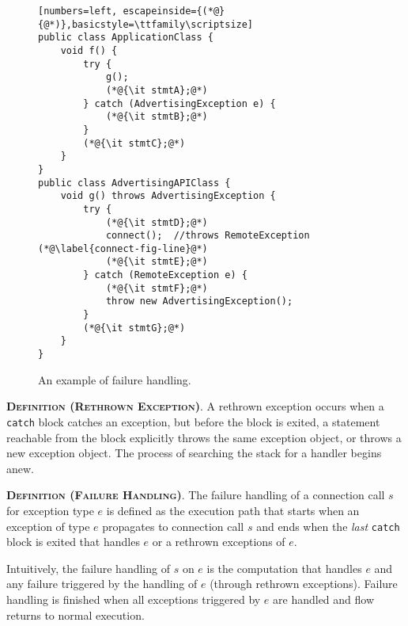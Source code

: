 \begin{figure}
\begin{lstlisting}[numbers=left, escapeinside={(*@}{@*)},basicstyle=\ttfamily\scriptsize]
public class ApplicationClass {
    void f() {
        try {
            g();
            (*@{\it stmtA};@*)
        } catch (AdvertisingException e) {
            (*@{\it stmtB};@*)
        }
        (*@{\it stmtC};@*)
    }
}
public class AdvertisingAPIClass {
    void g() throws AdvertisingException {
        try {
            (*@{\it stmtD};@*)
            connect();  //throws RemoteException (*@\label{connect-fig-line}@*)
            (*@{\it stmtE};@*)
        } catch (RemoteException e) {
            (*@{\it stmtF};@*)
            throw new AdvertisingException();            
        }        
        (*@{\it stmtG};@*)
    }
}
\end{lstlisting}
\vspace{-0.2in}
\caption{\label{fig:failure-handling}An example of failure handling.
}
\vspace{-0.1in}
\end{figure}

\begin{description}[leftmargin=0cm,listparindent=0pt,itemindent=0cm]
\item \textsc{\bfseries{Definition (Rethrown Exception)}}.  A
rethrown exception occurs when a \lstinline!catch! block catches an
exception, but before the block is exited, a statement reachable from
the block explicitly throws the same exception object, or throws a new
exception object.  The process of searching the stack for a handler
begins anew.

\item \textsc{\bfseries{Definition (Failure Handling)}}. The failure
  handling of a connection call $s$ for exception type $e$ is defined
  as the execution path that starts when an exception of type $e$
  propagates to connection call $s$ and ends when the {\it last}
  \lstinline!catch! block is exited that handles $e$ or a rethrown
  exceptions of $e$.
\end{description}

Intuitively, the failure handling of $s$ on $e$ is the computation
that handles $e$ and any failure triggered by the handling of $e$
(through rethrown exceptions).  Failure handling is finished when all
exceptions triggered by $e$ are handled and flow returns to normal
execution.  


